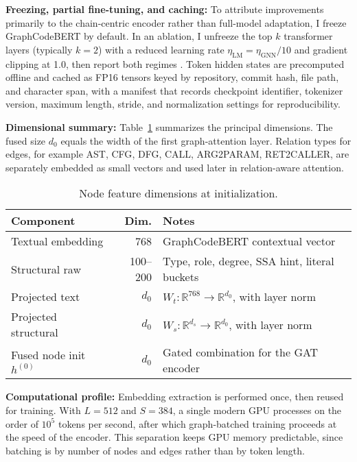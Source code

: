\documentclass{buthesis}
\begin{document}
\textbf{Freezing, partial fine-tuning, and caching:}
To attribute improvements primarily to the chain-centric encoder rather than full-model adaptation, I freeze GraphCodeBERT by default. In an ablation, I unfreeze the top $k$ transformer layers (typically $k{=}2$) with a reduced learning rate $\eta_{\text{LM}}{=}\eta_{\text{GNN}}/10$ and gradient clipping at 1.0, then report both regimes \cite{Li2022Empirical}. Token hidden states are precomputed offline and cached as FP16 tensors keyed by repository, commit hash, file path, and character span, with a manifest that records checkpoint identifier, tokenizer version, maximum length, stride, and normalization settings for reproducibility.

\textbf{Dimensional summary:}
Table~\ref{tab:feat-dims} summarizes the principal dimensions. The fused size $d_0$ equals the width of the first graph-attention layer. Relation types for edges, for example \textsc{AST}, \textsc{CFG}, \textsc{DFG}, \textsc{CALL}, \textsc{ARG2PARAM}, \textsc{RET2CALLER}, are separately embedded as small vectors and used later in relation-aware attention.

\begin{table}[H]
\centering
\caption{Node feature dimensions at initialization.}
\label{tab:feat-dims}
\begin{tabular}{lrl}
\toprule
\textbf{Component} & \textbf{Dim.} & \textbf{Notes} \\
\midrule
Textual embedding & 768 & GraphCodeBERT contextual vector \cite{guo2021graphcodebert} \\
Structural raw & 100–200 & Type, role, degree, SSA hint, literal buckets \\
Projected text & $d_0$ & $W_t:\mathbb{R}^{768}\!\to\!\mathbb{R}^{d_0}$, with layer norm \\
Projected structural & $d_0$ & $W_s:\mathbb{R}^{d_s}\!\to\!\mathbb{R}^{d_0}$, with layer norm \\
Fused node init $h^{(0)}$ & $d_0$ & Gated combination for the GAT encoder \\
\bottomrule
\end{tabular}
\end{table}

\textbf{Computational profile:}
Embedding extraction is performed once, then reused for training. With $L{=}512$ and $S{=}384$, a single modern GPU processes on the order of $10^5$ tokens per second, after which graph-batched training proceeds at the speed of the encoder. This separation keeps GPU memory predictable, since batching is by number of nodes and edges rather than by token length.
\end{document}
